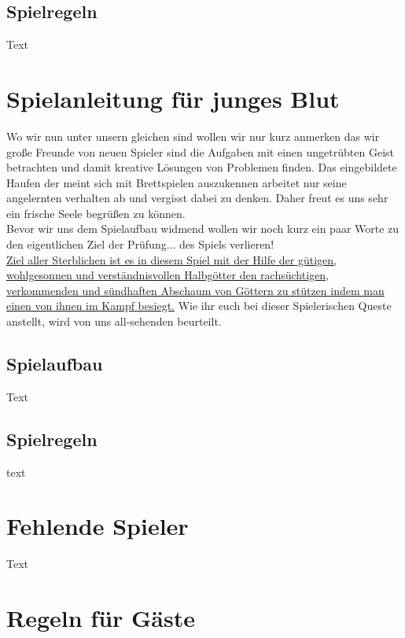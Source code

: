 \documentclass[11pt,a5paper,twoside,openright]{book}
\begin{document}
\subsection*{Spielregeln}

Text

\newpage

\section*{Spielanleitung für junges Blut}
\label{AnleitungJung}
Wo wir nun unter unsern gleichen sind wollen wir nur kurz anmerken das wir große Freunde von neuen Spieler sind die Aufgaben mit einen ungetrübten Geist betrachten und damit kreative Lösungen von Problemen finden. Das eingebildete Haufen der meint sich mit Brettspielen auszukennen arbeitet nur seine angelernten verhalten ab und vergisst dabei zu denken. Daher freut es uns sehr ein frische Seele begrüßen zu können.\\

Bevor wir uns dem Spielaufbau widmend wollen wir noch kurz ein paar Worte zu den eigentlichen Ziel der Prüfung... des Spiels verlieren!\\
\ul{Ziel aller Sterblichen ist es in diesem Spiel mit der Hilfe der gütigen, wohlgesonnen und verständnisvollen Halbgötter den rachsüchtigen, verkommenden und sündhaften Abschaum von Göttern zu stützen indem man einen von ihnen im Kampf besiegt.} Wie ihr euch bei dieser Spielerischen Queste anstellt, wird von uns all-sehenden beurteilt.

\subsection*{Spielaufbau}
Text 

\subsection*{Spielregeln}

text

\newpage

\section*{Fehlende Spieler}

Text

\newpage

\section*{Regeln für Gäste}
\label{ZusammenfassungFlasch}
\end{document}
